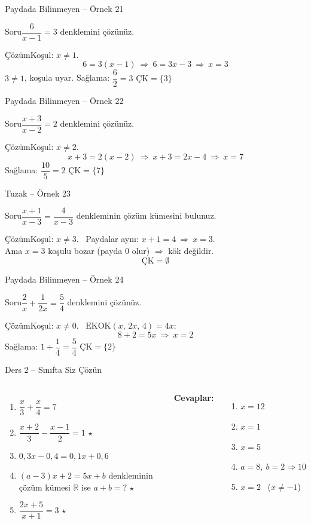 \documentclass[aspectratio=169,11pt,handout]{beamer}
\newcommand{\soru}[3]{%
\begin{frame}{#1}
  \begin{block}{Soru}\large #2\end{block}
  \pause
  \begin{exampleblock}{Çözüm}\large #3\end{exampleblock}
\end{frame}}
\begin{document}
\soru{Paydada Bilinmeyen -- Örnek 21}
{\(\dfrac{6}{x-1}=3\) denklemini çözünüz.}
{Koşul: \(x\neq 1\).
\[6=3(x-1)\ \Rightarrow\ 6=3x-3\ \Rightarrow\ x=3\]
\(3\neq 1\), koşula uyar. Sağlama: \(\dfrac{6}{2}=3\) \checkmark \qquad \(\text{ÇK}=\{3\}\)}

\soru{Paydada Bilinmeyen -- Örnek 22}
{\(\dfrac{x+3}{x-2}=2\) denklemini çözünüz.}
{Koşul: \(x\neq 2\).
\[x+3=2(x-2)\ \Rightarrow\ x+3=2x-4\ \Rightarrow\ x=7\]
Sağlama: \(\dfrac{10}{5}=2\) \checkmark \qquad \(\text{ÇK}=\{7\}\)}

\soru{Tuzak -- Örnek 23}
{\(\dfrac{x+1}{x-3}=\dfrac{4}{x-3}\) denkleminin çözüm kümesini bulunuz.}
{Koşul: \(x\neq 3\). \ Paydalar aynı: \(x+1=4\ \Rightarrow\ x=3\).\\[3pt]
Ama \(x=3\) koşulu bozar (payda \(0\) olur) \(\Rightarrow\) kök değildir.
\[\text{ÇK}=\emptyset\]}

\soru{Paydada Bilinmeyen -- Örnek 24}
{\(\dfrac{2}{x}+\dfrac{1}{2x}=\dfrac{5}{4}\) denklemini çözünüz.}
{Koşul: \(x\neq 0\). \ \(\text{EKOK}(x,\,2x,\,4)=4x\):
\[8+2=5x\ \Rightarrow\ x=2\]
Sağlama: \(1+\dfrac{1}{4}=\dfrac{5}{4}\) \checkmark \qquad \(\text{ÇK}=\{2\}\)}

\begin{frame}{Ders 2 -- Sınıfta Siz Çözün}
\begin{columns}[t]
\begin{enumerate}
\item \(\dfrac{x}{3}+\dfrac{x}{4}=7\)
\item \(\dfrac{x+2}{3}-\dfrac{x-1}{2}=1\) \(\star\)
\item \(0{,}3x-0{,}4=0{,}1x+0{,}6\)
\item \((a-3)x+2=5x+b\) denkleminin çözüm kümesi \(\mathbb{R}\) ise \(a+b=?\) \(\star\)
\item \(\dfrac{2x+5}{x+1}=3\) \(\star\)
\end{enumerate}
\pause
\textbf{Cevaplar:}
\begin{enumerate}
\item \(x=12\)\\[6pt]
\item \(x=1\)\\[6pt]
\item \(x=5\)
\item \(a=8,\ b=2\Rightarrow 10\)\\[6pt]
\item \(x=2\) \ (\(x\neq-1\))
\end{enumerate}
\end{columns}
\vspace{4pt}{\footnotesize \(\star\) işaretli soruların adım adım çözümü sonraki slaytlardadır.}
\end{frame}
\end{document}

